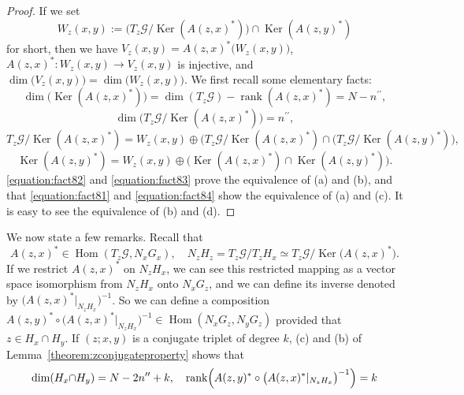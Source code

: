 \documentclass[a4paper,11pt,reqno]{amsart}
\theoremstyle{definition}
\theoremstyle{remark}
\begin{document}
%
%
\begin{proof}
If we set 
%
%
$$
W_z(x,y):=\bigl(T_z\mathcal{G}/\operatorname{Ker}(A(z,x)^\ast)\bigr)\cap\operatorname{Ker}(A(z,y)^\ast)
$$ 
%
%
for short, then we have $V_z(x,y)=A(z,x)^\ast\bigl(W_z(x,y)\bigr)$, 
$A(z,x)^\ast: W_z(x,y) \rightarrow V_z(x,y)$ is injective, and 
$\dim\bigl(V_z(x,y)\bigr)=\dim\bigl(W_z(x,y)\bigr)$.  
We first recall some elementary facts:
%
%
\begin{equation}
\dim\bigl(\operatorname{Ker}(A(z,x)^\ast)\bigr)=\dim(T_z\mathcal{G})-\operatorname{rank}(A(z,x)^\ast)=N-n^{\prime\prime},
\label{equation:fact81}
\end{equation}
%
% 
\begin{equation}
\dim\bigl(T_z\mathcal{G}/\operatorname{Ker}(A(z,x)^\ast)\bigr)=n^{\prime\prime}, 
\label{equation:fact82}
\end{equation}
%
%
\begin{equation}
T_z\mathcal{G}/\operatorname{Ker}(A(z,x)^\ast)
=
W_z(x,y)
\oplus
\bigl(
T_z\mathcal{G}/\operatorname{Ker}(A(z,x)^\ast)
\cap
(T_z\mathcal{G}/\operatorname{Ker}(A(z,y)^\ast)
\bigr),
\label{equation:fact83}
\end{equation}
%
%
\begin{equation}
\operatorname{Ker}(A(z,y)^\ast)
=
W_z(x,y)
\oplus
\bigl(\operatorname{Ker}(A(z,x)^\ast)\cap\operatorname{Ker}(A(z,y)^\ast)\bigr).
\label{equation:fact84}
\end{equation}
%
%
\eqref{equation:fact82} and  \eqref{equation:fact83} prove the equivalence of (a) and (b), 
and that \eqref{equation:fact81} and  \eqref{equation:fact84} show the equivalence of (a) and (c). 
It is easy to see the equivalence of (b) and (d). 
\end{proof}
%
%
We now state a few remarks. 
Recall that 
%
%
$$
A(z,x)^\ast \in \operatorname{Hom}(T_z\mathcal{G},N_xG_x), 
\quad
N_zH_z=T_z\mathcal{G}/T_zH_x \simeq T_z\mathcal{G}/\operatorname{Ker}\bigl(A(z,x)^\ast\bigr).
$$ 
%
%
If we restrict $A(z,x)^\ast$ on $N_zH_x$, 
we can see this restricted mapping as a vector space isomorphism from $N_zH_x$ onto $N_xG_z$, 
and we can define its inverse denoted by $\bigl(A(z,x)^\ast\vert_{N_zH_x}\bigr)^{-1}$. 
So we can define a composition 
$A(z,y)^\ast\circ\bigl(A(z,x)^\ast\vert_{N_zH_x}\bigr)^{-1} \in \operatorname{Hom}(N_xG_z,N_yG_z)$ 
provided that $z \in H_x{\cap}H_y$. 
If $(z;x,y)$ is a conjugate triplet of degree $k$, 
(c) and (b) of Lemma~\ref{theorem:zconjugateproperty} shows that 
%
%
\begin{equation}
\dim(H_x{\cap}H_y)=N-2n^{\prime\prime}+k, 
\quad
\operatorname{rank}
\Bigl(A(z,y)^\ast\circ\bigl(A(z,x)^\ast\vert_{N_zH_x}\bigr)^{-1}\Bigr)
=
k
\label{equation:rankisk}
\end{equation}
\end{document}
